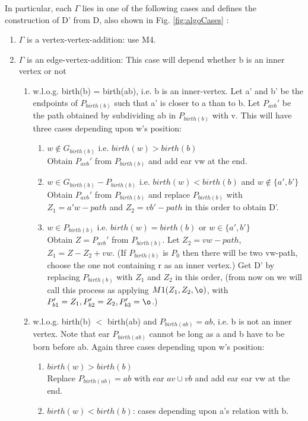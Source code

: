 \begin{lem}
In particular, each $\Gamma$ lies in one of the following cases and defines the construction of D' from D, also shown in Fig. \ref{fig:algoCases} :
\begin{enumerate}
\item $\Gamma$ is a vertex-vertex-addition: use M4.
\item $\Gamma$ is an edge-vertex-addition: This case will depend whether b is an inner vertex or not
	\begin{enumerate}
	\item w.l.o.g. birth(b) = birth(ab), i.e. b is an inner-vertex.
	Let a' and b' be the endpoints of $P_{birth(b)}$ such that a' is closer to a than to b.
	Let $P_{avb}'$ be the path obtained by subdividing ab in $P_{birth(b)}$ with v.
	This will have three cases depending upon w's position:
		\begin{enumerate}
		\item $w \notin G_{birth(b)}$ i.e. $birth(w) > birth(b)$ \\
		Obtain $P_{avb}'$ from $P_{birth(b)}$ and add ear vw at the end.
		\item $w \in G_{birth(b)} - P_{birth(b)}$ i.e. $birth(w) < birth(b)$ and $w \notin \{a',b'\}$ \\
		Obtain $P_{avb}'$ from $P_{birth(b)}$ and replace $P_{birth(b)}$ with $Z_1 = a'w-path$ and $Z_2 = vb'-path$ in this order to obtain D'.
		\item $w \in P_{birth(b)}$ i.e. $birth(w) = birth(b)$ or $w \in \{a',b'\}$ \\
		Obtain $Z = P_{avb}'$ from $P_{birth(b)}$. Let $Z_2 = vw-path$, $Z_1 = Z - Z_2 + vw$.
		(If $P_{birth(b)}$ is $P_0$ then there will be two vw-path, choose the one not containing r as an inner vertex.)
		Get D' by replacing $P_{birth(b)}$ with $Z_1$ and $Z_2$ in this order, (from now on we will call this process as applying $M1(Z_1,Z_2,\o)$, with $P_{b1}'=Z_1, P_{b2}'=Z_2, P_{b3}' = \o $.)
		\end{enumerate}
	\item w.l.o.g. birth(b) $<$ birth(ab) and $P_{birth(ab)} = ab$, i.e. b is not an inner vertex. Note that ear $P_{birth(ab)}$ cannot be long as a and b have to be born before ab.
	Again three cases depending upon w's position:
		\begin{enumerate}
		\item $birth(w) > birth(b)$ \\
		Replace $P_{birth(ab)} = ab$ with ear $av \cup vb$ and add ear ear vw at the end.
		\item $birth(w) < birth(b)$: cases depending upon a's relation with b.

\end{enumerate}
\end{enumerate}
\end{enumerate}
\end{lem}
